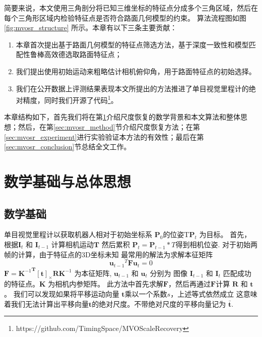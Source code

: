 简要来说，本文使用三角剖分将已知三维坐标的特征点分成多个三角区域，然后在每个三角形区域内检验特征点是否符合路面几何模型的约束。
算法流程图如图 \ref{fig:mvosr_structure} 所示。本章有以下三条主要贡献：
\begin{enumerate}
    \item 本章首次提出基于路面几何模型的特征点筛选方法，基于深度一致性和模型匹配性鲁棒高效德选取路面特征点；
    \item 我们提出使用初始运动来粗略估计相机俯仰角，用于路面特征点的初始选择。
    \item 我们在公开数据上评测结果表现本文所提出的方法推进了单目视觉里程计的绝对精度，同时我们开源了代码\footnote{https://github.com/TimingSpace/MVOScaleRecovery}。
\end{enumerate}
本章结构如下，首先我们将在第\ref{sec:math_bg}介绍尺度恢复的数学背景和本文算法和整体思想；然后，在第\ref{sec:mvosr_method}节介绍尺度恢复方法；在第
\ref{sec:mvosr_experiment}进行实验验证本方法的有效性；最后在第\ref{sec:mvosr_conclusion}节总结全文工作。

\section{数学基础与总体思想}
\label{sec:math_bg}
\subsection{数学基础}
单目视觉里程计以获取机器人相对于初始坐标系 $\mathbf{P}_0$的位姿T$\mathbf{P}_t$ 为目标。
首先，根据$\mathbf{I}_t$ 和 $\mathbf{I}_{t-1}$ 计算相机运动$\mathbf{T}$ 然后累积
$\mathbf{P}_t = \mathbf{P}_{t-1}*T$得到相机位姿. 对于初始两帧的计算，由于特征点的3D坐标未知
最常用的解法为求解本征矩阵\cite{luong1996fundamental}
\begin{equation}
    {\mathbf{u}_{t-1}}^T\mathbf{F}\mathbf{u}_{t}=0
\end{equation}
$\mathbf{F} = {\mathbf{K}^{-1}}^\mathbf{T}[\mathbf{t}]_{\times}\mathbf{R}\mathbf{K}^{-1}$ 为本征矩阵,
 $\mathbf{u}_{t-1}$ 和 $\mathbf{u}_t$ 分别为
图像 $\mathbf{I}_{t-1}$ 和 $\mathbf{I}_t$ 匹配成功的特征点。$\mathbf{K}$ 为相机内参矩阵。 
此方法中首先求解$\mathbf{F}$，然后再通过$\mathbf{F}$计算
$\mathbf{R}$ 和 $\mathbf{t}$ \cite{nister2004efficient}。
我们可以发现如果将平移运动向量 $\mathbf{t}$乘以一个系数$s$，上述等式依然成立
这意味着我们无法计算出平移向量$\mathbf{t}$的绝对尺度。不带绝对尺度的平移向量记为 $\bar{\mathbf{t}}$.

